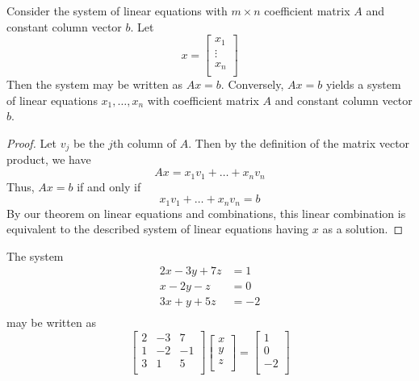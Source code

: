\documentclass{article}
\begin{document}
\begin{theorem}
  Consider the system of linear equations with $m \times n$ coefficient matrix $A$ and constant column vector $b$. Let
  \[ x =
    \begin{bmatrix}
      x_1\\
      \vdots\\
      x_n\\
  \end{bmatrix}\]
  Then the system may be written as $Ax = b$. Conversely, $Ax = b$ yields a system of linear equations $x_1, \ldots, x_n$ with coefficient matrix $A$ and constant column vector $b$.
\end{theorem}
\begin{proof}
  Let $v_j$ be the $j$th column of $A$. Then by the definition of the matrix vector product, we have
  \[Ax = x_1v_1 + \dots + x_nv_n\]
  Thus, $Ax = b$ if and only if
  \[x_1v_1 + \dots + x_nv_n = b\]
  By our theorem on linear equations and combinations, this linear combination is equivalent to the described system of linear equations having $x$ as a solution.
\end{proof}
\begin{example}
  The system
  \begin{align*}
    2x - 3y + 7z &= 1\\
    x - 2y -z &= 0\\
    3x + y +5z &= -2\\
  \end{align*}
  may be written as
  \[
    \begin{bmatrix}
      2 & -3 & 7\\
      1 & -2 & -1\\
      3 & 1 & 5\\
    \end{bmatrix}
    \begin{bmatrix}
      x\\
      y\\
      z\\
    \end{bmatrix}
    =
    \begin{bmatrix}
      1\\
      0\\
      -2\\
    \end{bmatrix}
  \]
\end{example}
\end{document}
